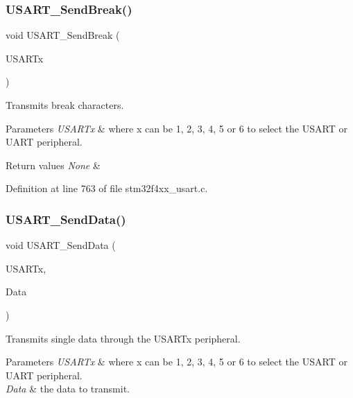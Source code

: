 \subsubsection{\texorpdfstring{U\+S\+A\+R\+T\+\_\+\+Send\+Break()}{USART\_SendBreak()}}
{\footnotesize\ttfamily void U\+S\+A\+R\+T\+\_\+\+Send\+Break (\begin{DoxyParamCaption}\item[{\hyperlink{struct_u_s_a_r_t___type_def}{U\+S\+A\+R\+T\+\_\+\+Type\+Def} $\ast$}]{U\+S\+A\+R\+Tx }\end{DoxyParamCaption})}



Transmits break characters. 


\begin{DoxyParams}{Parameters}
{\em U\+S\+A\+R\+Tx} & where x can be 1, 2, 3, 4, 5 or 6 to select the U\+S\+A\+RT or U\+A\+RT peripheral. \\
\hline
\end{DoxyParams}

\begin{DoxyRetVals}{Return values}
{\em None} & \\
\hline
\end{DoxyRetVals}


Definition at line 763 of file stm32f4xx\+\_\+usart.\+c.

\mbox{\label{group___u_s_a_r_t_ga0b43d42da9540f446d494bf69823c6fb}} 
\subsubsection{\texorpdfstring{U\+S\+A\+R\+T\+\_\+\+Send\+Data()}{USART\_SendData()}}
{\footnotesize\ttfamily void U\+S\+A\+R\+T\+\_\+\+Send\+Data (\begin{DoxyParamCaption}\item[{\hyperlink{struct_u_s_a_r_t___type_def}{U\+S\+A\+R\+T\+\_\+\+Type\+Def} $\ast$}]{U\+S\+A\+R\+Tx,  }\item[{uint16\+\_\+t}]{Data }\end{DoxyParamCaption})}



Transmits single data through the U\+S\+A\+R\+Tx peripheral. 


\begin{DoxyParams}{Parameters}
{\em U\+S\+A\+R\+Tx} & where x can be 1, 2, 3, 4, 5 or 6 to select the U\+S\+A\+RT or U\+A\+RT peripheral. \\
\hline
{\em Data} & the data to transmit. \\
\hline
\end{DoxyParams}


